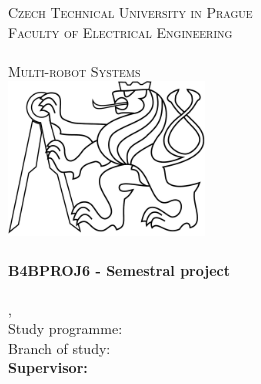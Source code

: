 
\begin{titlepage}
  \begin{center}

    \textsc{\Large Czech Technical University in Prague}\\[1em]
    \textsc{\large Faculty of Electrical Engineering\\
    \Department\\
    Multi-robot Systems\\[3em]
    }
    \includegraphics[height=4.1cm]{fig/ctu_lion.pdf}\\[3em]

    \textbf{\textsc{\Large \Title}}\\[2em]

    \textbf{\Large B4BPROJ6 - Semestral project}\\[6em]

    \textbf{\huge \Author}\\[6em]

    {\large \Location, \Date}\\[3em]

    Study programme: \Programme\\
    Branch of study: \Field\\[4em]

    \textbf{Supervisor: \Supervisor}\\

    \vspace{2pt}

  \end{center}
\end{titlepage}
